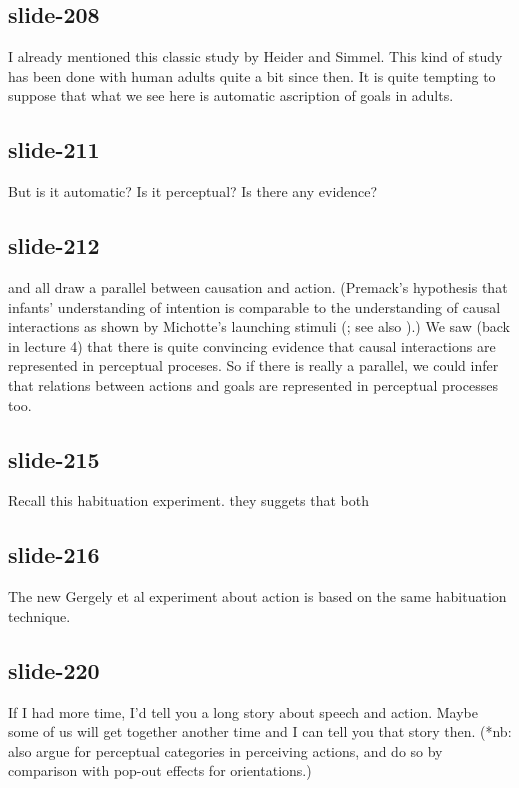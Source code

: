 \documentclass[12pt,\papersize]{extarticle}
\begin{document}
 
\subsection{slide-208}
I already mentioned this classic study by Heider and Simmel.
This kind of study has been done with human adults quite a bit since then.
It is quite tempting to suppose that what we see here is automatic ascription of goals in adults.
 
 
\subsection{slide-211}
But is it automatic? Is it perceptual? Is there any evidence?
 
 
\subsection{slide-212}
\citet{Premack:1990jl} and \citet{Scholl:2000eq} all draw a parallel between causation and action.
(Premack's hypothesis that infants' understanding of intention is comparable to the understanding of causal interactions as shown by Michotte's launching stimuli (\citep{Premack:1990jl}; see also \citep{Premack:1997ek}).)
We saw (back in lecture 4) that there is quite convincing evidence that causal interactions are represented in perceptual proceses.
So if there is really a parallel, we could infer that relations between actions and goals are represented in perceptual processes too.
 
 
\subsection{slide-215}
Recall this habituation experiment.
they suggets that both
 
 
\subsection{slide-216}
The new Gergely et al experiment about action is based on the same habituation technique.
 
 
\subsection{slide-220}
If I had more time, I'd tell you a long story about speech and action.
Maybe some of us will get together another time and I can tell you that story then.
(*nb: \citep{zwickel:2010_interference} also argue for perceptual categories in perceiving actions, and do so by comparison with pop-out effects for orientations.)
 
\end{document}
